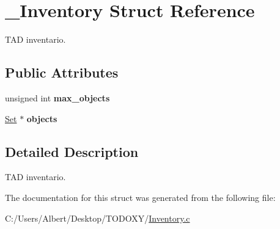 \hypertarget{struct___inventory}{\section{\-\_\-\-Inventory Struct Reference}
\label{struct___inventory}
}


T\-A\-D inventario.  


\subsection*{Public Attributes}
\begin{DoxyCompactItemize}
\item 
\hypertarget{struct___inventory_a5260450568d1d2fd34dc7d9ab229ef67}{unsigned int {\bfseries max\-\_\-objects}}\label{struct___inventory_a5260450568d1d2fd34dc7d9ab229ef67}

\item 
\hypertarget{struct___inventory_a478e4b50a62b9e7d5b17e335319faa97}{\hyperlink{_set_8h_a6d3b7f7c92cbb4577ef3ef7ddbf93161}{Set} $\ast$ {\bfseries objects}}\label{struct___inventory_a478e4b50a62b9e7d5b17e335319faa97}

\end{DoxyCompactItemize}


\subsection{Detailed Description}
T\-A\-D inventario. 


\begin{DoxyItemize}
\item 
\end{DoxyItemize}

The documentation for this struct was generated from the following file\-:\begin{DoxyCompactItemize}
\item 
C\-:/\-Users/\-Albert/\-Desktop/\-T\-O\-D\-O\-X\-Y/\hyperlink{_inventory_8c}{Inventory.\-c}\end{DoxyCompactItemize}

